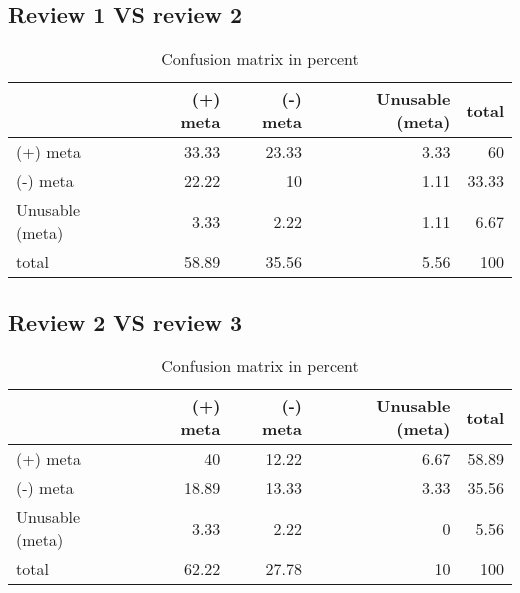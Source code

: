 \documentclass{article}
\begin{document}
\subsection{Review 1 VS review 2} 

\begin{table}[H]

\centering

\begin{tabular}{lrrrr}
\hline
                 &   (+) meta &   (-) meta &   Unusable (meta) &   total \\
\hline
 (+) meta        &      33.33 &      23.33 &              3.33 &   60    \\
 (-) meta        &      22.22 &      10    &              1.11 &   33.33 \\
 Unusable (meta) &       3.33 &       2.22 &              1.11 &    6.67 \\
 total           &      58.89 &      35.56 &              5.56 &  100    \\
\hline
\end{tabular}\caption{Confusion matrix in percent}

\end{table}



\subsection{Review 2 VS review 3} 

\begin{table}[H]

\centering

\begin{tabular}{lrrrr}
\hline
                 &   (+) meta &   (-) meta &   Unusable (meta) &   total \\
\hline
 (+) meta        &      40    &      12.22 &              6.67 &   58.89 \\
 (-) meta        &      18.89 &      13.33 &              3.33 &   35.56 \\
 Unusable (meta) &       3.33 &       2.22 &              0    &    5.56 \\
 total           &      62.22 &      27.78 &             10    &  100    \\
\hline
\end{tabular}\caption{Confusion matrix in percent}

\end{table}
\end{document}
